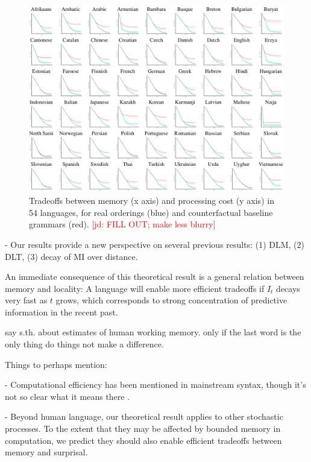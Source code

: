 \documentclass[12pt]{article}
\newcommand{\jd}[1]{\textcolor{Red}{[jd: #1]}}
\begin{document}
\begin{figure}
\includegraphics[width=\textwidth]{figures/full-results.png}
	\caption{Tradeoffs between memory (x axis) and processing cost (y axis) in 54 languages, for real orderings (blue) and counterfactual baseline grammars (red). \jd{FILL OUT; make less blurry}}\label{fig:results}
\end{figure}




- Our results provide a new perspective on several previous results: (1) DLM, (2) DLT, (3) decay of MI over distance.

An immediate consequence of this theoretical result is a general relation between memory and locality:
A language will enable more efficient tradeoffs if $I_t$ decays very fast as $t$ grows, which corresponds to strong concentration of predictive information in the recent past.



say s.th. about estimates of human working memory. only if the last word is the only thing do things not make a difference.


Things to perhaps mention:


- Computational efficiency has been mentioned in mainstream syntax, though it's not so clear what it means there \cite{chomsky2005three,hauser2002faculty}.

- Beyond human language, our theoretical result applies to other stochastic processes. To the extent that they may be affected by bounded memory in computation, we predict they should also enable efficient tradeoffs between memory and surprisal.
\end{document}
